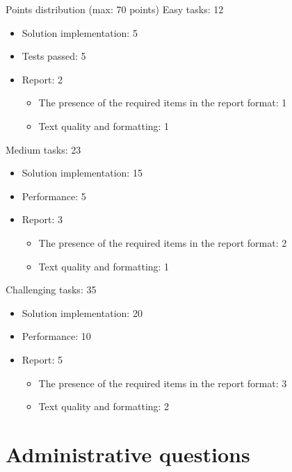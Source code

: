 \documentclass{beamer}
\begin{document}
\begin{frame}[shrink]{Points distribution (max: 70 points)}
    Easy tasks: 12
    \begin{itemize}
        \item Solution implementation: 5
        \item Tests passed: 5
        \item Report: 2
        \begin{itemize}
            \item The presence of the required items in the report format: 1
            \item Text quality and formatting: 1
        \end{itemize}
    \end{itemize}
    Medium tasks: 23
    \begin{itemize}
        \item Solution implementation: 15
        \item Performance: 5
        \item Report: 3
        \begin{itemize}
            \item The presence of the required items in the report format: 2
            \item Text quality and formatting: 1
        \end{itemize}
    \end{itemize}
    Challenging tasks: 35
    \begin{itemize}
        \item Solution implementation: 20
        \item Performance: 10
        \item Report: 5
        \begin{itemize}
            \item The presence of the required items in the report format: 3
            \item Text quality and formatting: 2
        \end{itemize}
    \end{itemize}
\end{frame}

\section{Administrative questions}
\end{document}
